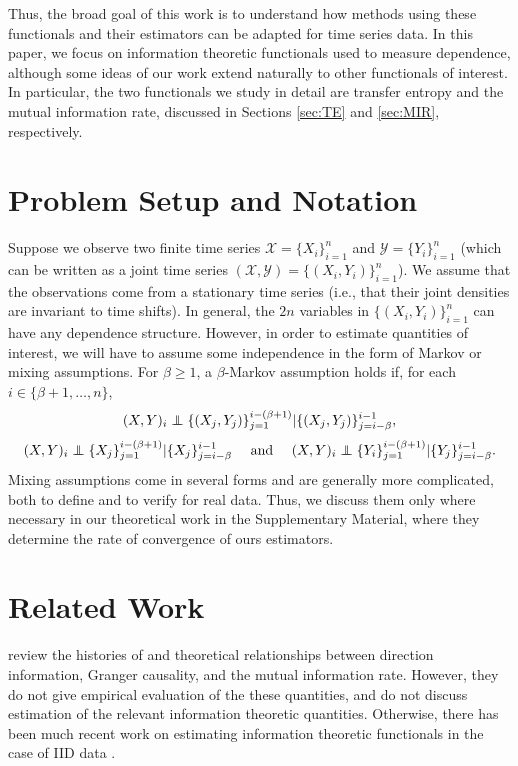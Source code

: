 \documentclass{article} %
\newcommand{\X}{\mathcal{X}}                        %
\newcommand{\Y}{\mathcal{Y}}                        %
\newcommand\ind{\protect\mathpalette{\protect\independenT}{\perp}}
\def\independenT#1#2{\mathrel{\rlap{$#1#2$}\mkern2mu{#1#2}}}
\begin{document}
Thus, the broad goal of this work is to understand how methods using these
functionals and their estimators can be adapted for time series data.
In this paper, we focus on information theoretic functionals used to measure
dependence, although some ideas of our work extend naturally to other
functionals of interest. In particular, the two functionals we study in detail
are transfer entropy and the mutual information rate, discussed in Sections
\ref{sec:TE} and \ref{sec:MIR}, respectively.

\section{Problem Setup and Notation}
Suppose we observe two finite time series $\X = \{X_i\}_{i = 1}^n$ and
$\Y = \{Y_i\}_{i = 1}^n$ (which can be written as a joint time series
$(\X, \Y) = \{(X_i,Y_i)\}_{i = 1}^n$). We assume that the observations come
from a stationary time series (i.e., that their joint densities are invariant
to time shifts). In general, the $2n$ variables in $\{(X_i,Y_i)\}_{i = 1}^n$
can have any dependence structure. However, in order to estimate quantities of
interest, we will have to assume some independence in the form of Markov or
mixing assumptions. For $\beta \geq 1$, a $\beta$-Markov assumption holds if,
for each $i \in \{\beta + 1,\dots,n\}$,
\begin{equation}
(X,Y)_i \ind \{(X_j,Y_j)\}_{j = 1}^{i - (\beta + 1)}
                                    | \{(X_j,Y_j)\}_{j = i - \beta}^{i - 1},
\label{joint_markov}
\end{equation}
\begin{equation}
(X,Y)_i \ind \{X_j\}_{j = 1}^{i - (\beta + 1)}
                                            | \{X_j\}_{j = i - \beta}^{i - 1}
    \quad \mbox{ and } \quad
(X,Y)_i \ind \{Y_i\}_{j = 1}^{i - (\beta + 1)}
                                        | \{Y_j\}_{j = i - \beta}^{i - 1}.
\label{marginal_markov}
\end{equation}
Mixing assumptions come in several forms and are generally more complicated,
both to define and to verify for real data. Thus, we discuss them only where
necessary in our theoretical work in the Supplementary Material, where they
determine the rate of convergence of ours estimators.

\section{Related Work}
\citet{amblard2012relation} review the histories of and theoretical
relationships between direction information, Granger causality, and the mutual
information rate. However, they do not give empirical evaluation of the these
quantities, and do not discuss estimation of the relevant information theoretic
quantities. Otherwise, there has been much recent work on estimating
information theoretic functionals in the case of IID data
\citep{pal2010estimation,nguyen2010estimating,singh14densityfunc,krishnamurthy14divergences,moon14ensemble,gao2014stronglyDependent}.
\end{document}
